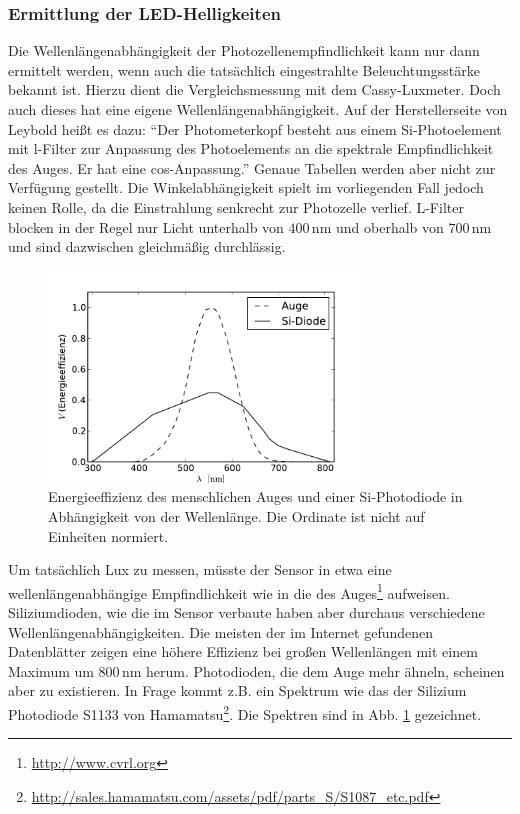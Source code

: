 \documentclass[11pt]{scrartcl}
\newcommand{\unit}[1]{\ensuremath{\,\mathrm{#1}}} %
\begin{document}
\subsubsection{Ermittlung der LED-Helligkeiten}
Die Wellenlängenabhängigkeit der Photozellenempfindlichkeit kann nur dann ermittelt werden, wenn auch die tatsächlich eingestrahlte Beleuchtungsstärke bekannt ist. Hierzu dient die Vergleichsmessung mit dem Cassy-Luxmeter. Doch auch dieses hat eine eigene Wellenlängenabhängigkeit. Auf der Herstellerseite von Leybold heißt es dazu: "`Der Photometerkopf besteht aus einem Si-Photoelement mit l-Filter zur Anpassung des Photoelements an die spektrale Empfindlichkeit des Auges. Er hat eine cos-Anpassung."' Genaue Tabellen werden aber nicht zur Verfügung gestellt. Die Winkelabhängigkeit spielt im vorliegenden Fall jedoch keinen Rolle, da die Einstrahlung senkrecht zur Photozelle verlief. L-Filter blocken in der Regel nur Licht unterhalb von $400\unit{nm}$ und oberhalb von $700\unit{nm}$ und sind dazwischen gleichmäßig durchlässig.
\begin{figure}[ht]
\begin{center}
\includegraphics[width=0.75\textwidth]{images/lichteffizienz_silizium_auge.pdf}
\end{center}
\vspace{-1.5\baselineskip}
\caption{Energieeffizienz des menschlichen Auges und einer Si-Photodiode in Abhängigkeit von der Wellenlänge. Die Ordinate ist nicht auf Einheiten normiert.}
\label{lichteffizienz_auge}
\end{figure}
Um tatsächlich Lux zu messen, müsste der Sensor in etwa eine wellenlängenabhängige Empfindlichkeit wie in die des Auges\footnote{\url{http://www.cvrl.org}} aufweisen. Siliziumdioden, wie die im Sensor verbaute haben aber durchaus verschiedene Wellenlängenabhängigkeiten. Die meisten der im Internet gefundenen Datenblätter zeigen eine höhere Effizienz bei großen Wellenlängen mit einem Maximum um $800\unit{nm}$ herum. Photodioden, die dem Auge mehr ähneln, scheinen aber zu existieren. In Frage kommt z.B. ein Spektrum wie das der Silizium Photodiode S1133 von Hamamatsu\footnote{\url{http://sales.hamamatsu.com/assets/pdf/parts_S/S1087_etc.pdf}}. Die Spektren sind in Abb. \ref{lichteffizienz_auge} gezeichnet.
\end{document}
